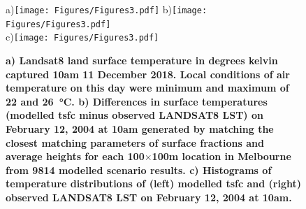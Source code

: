 \documentclass[final,3p,times,authoryear]{elsarticle}
\begin{document}
\begin{figure}
\centering
a)\texttt{[image: Figures/Figures3.pdf]}
b)\texttt{[image: Figures/Figures3.pdf]}\\
c)\texttt{[image: Figures/Figures3.pdf]}
\caption{\bf a) Landsat8 land surface temperature in degrees kelvin captured 10am 11 December 2018. Local conditions of air temperature on this day were minimum and maximum of 22 and 26\SI{}{\degreeCelsius}. b) Differences in surface temperatures (modelled \gls{tsfc} minus observed LANDSAT8 LST) on February 12, 2004 at 10am generated by matching the closest matching parameters of surface fractions and average heights for each 100$\times$100m location in Melbourne from 9814 modelled scenario results. c) Histograms of temperature distributions of (left) modelled \gls{tsfc} and (right) observed LANDSAT8 LST on February 12, 2004 at 10am. }
 \label{fig:TsfcDiffMelb}
\end{figure}




\end{document}
